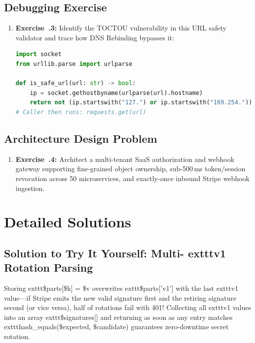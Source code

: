 \subsection{Debugging Exercise}
\begin{enumerate}[leftmargin=15pt]
  \item \textbf{Exercise~\thechapter.3:} Identify the TOCTOU vulnerability in this URL safety validator and trace how DNS Rebinding bypasses it:
\begin{lstlisting}[language=Python]
import socket
from urllib.parse import urlparse

def is_safe_url(url: str) -> bool:
    ip = socket.gethostbyname(urlparse(url).hostname)
    return not (ip.startswith("127.") or ip.startswith("169.254."))
# Caller then runs: requests.get(url)
\end{lstlisting}
\end{enumerate}

\subsection{Architecture Design Problem}
\begin{enumerate}[leftmargin=15pt]
  \item \textbf{Exercise~\thechapter.4:} Architect a multi-tenant SaaS authorization and webhook gateway supporting fine-grained object ownership, sub-500\,ms token/session revocation across 50 microservices, and exactly-once inbound Stripe webhook ingestion.
\end{enumerate}

\section{Detailed Solutions}

\subsection{Solution to Try It Yourself: Multi-	exttt{v1} Rotation Parsing}
Storing 	exttt{\$parts[\$k] = \$v} overwrites 	exttt{\$parts['v1']} with the last 	exttt{v1} value---if Stripe emits the new valid signature first and the retiring signature second (or vice versa), half of rotations fail with 401! Collecting all 	exttt{v1} values into an array 	exttt{\$signatures[]} and returning as soon as any entry matches 	exttt{hash\_equals(\$expected, \$candidate)} guarantees zero-downtime secret rotation.

